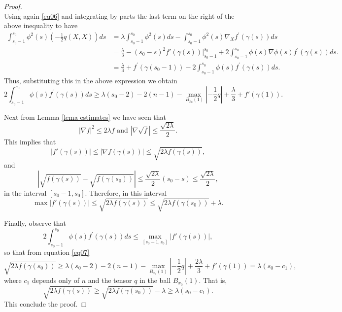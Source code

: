 \documentclass{amsart}
\theoremstyle{plain}
\numberwithin{equation}{section}
\begin{document}
\begin{proof}
\begin{equation}
\end{equation}
Using again \eqref{eq06} and integrating by parts the last term on the right of the above inequality to have
\begin{align*}
\int_{s_0-1}^{s_0} \phi^2(s)\left(-\frac{1}{2}q(X,X)\right)ds  &=  \lambda\int_{s_0-1}^{s_0}\phi^2(s)ds - \int_{s_0-1}^{s_0}\phi^2(s)\nabla_{X}f^{\prime}(\gamma(s))ds \\
&= \frac{\lambda}{3} -(s_0-s)^2f'(\gamma(s))|_{s_0-1}^{s_0} +2\int_{s_0-1}^{s_0}\phi(s)\nabla\phi(s)f^{\prime}(\gamma(s))ds.\\
&= \frac{\lambda}{3} + f^{\prime}(\gamma(s_0-1)) -2\int_{s_0-1}^{s_0}\phi(s)f^{\prime}(\gamma(s))ds.
\end{align*}
Thus, substituting this in the above expression we obtain
\begin{equation}\label{eq07}
2\int_{s_0-1}^{s_0}\phi(s)f^{\prime}(\gamma(s))ds \geq \lambda(s_{0}-2) -2(n-1) - \max_{B_{x_0}(1)}\left|-\frac{1}{2}q\right| + \frac{\lambda}{3} + f'(\gamma(1)).
\end{equation}

Next from Lemma \ref{lema estimates} we have seen that
$$|\nabla f|^2\leq 2\lambda f\,\,{\text{and}}\,\,|\nabla\sqrt{f}|\leq \frac{\sqrt{2\lambda}}{2}.$$
This implies that
$$|f'(\gamma(s))|\leq|\nabla f(\gamma(s))|\leq\sqrt{2\lambda f(\gamma(s))},$$
and 
$$|\sqrt{f(\gamma(s))}-\sqrt{f(\gamma(s_0))}|\leq\frac{\sqrt{2\lambda}}{2}(s_0-s)\leq\frac{\sqrt{2\lambda}}{2},$$
in the interval $[s_0-1,s_0]$. Therefore, in this interval
$$\max|f'(\gamma(s))|\leq\sqrt{2\lambda f(\gamma(s))}\leq\sqrt{2\lambda f(\gamma(s_0))}+\lambda.$$

Finally, observe that
$$2\int_{s_0-1}^{s_0}\phi(s)f^{\prime}(\gamma(s))ds\leq\max_{[s_0-1,s_0]}|f'(\gamma(s))|,$$
so that from equation \eqref{eq07}
$$\sqrt{2\lambda f(\gamma(s_0))}\geq \lambda(s_{0}-2) -2(n-1) - \max_{B_{x_0}(1)}\left|-\frac{1}{2}q\right| + \frac{2\lambda}{3} + f'(\gamma(1))=\lambda(s_0-c_1),$$
where $c_1$ depends only of $n$ and the tensor $q$ in the ball $B_{x_0}(1)$. That is,
$$\sqrt{2\lambda f(\gamma(s))}\geq \sqrt{2\lambda f(\gamma(s_0))}-\lambda\geq\lambda(s_0-c_1).$$
This conclude the proof.
\end{proof}
\end{document}
